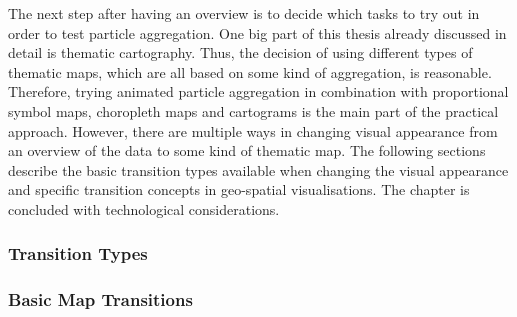 The next step after having an overview is to decide which tasks to try out in order to test particle aggregation. One big part of this thesis already discussed in detail is thematic cartography. Thus, the decision of using different types of thematic maps, which are all based on some kind of aggregation, is reasonable. Therefore, trying animated particle aggregation in combination with proportional symbol maps, choropleth maps and cartograms is the main part of the practical approach. However, there are multiple ways in changing visual appearance from an overview of the data to some kind of thematic map. The following sections describe the basic transition types available when changing the visual appearance and specific transition concepts in geo-spatial visualisations. The chapter is concluded with technological considerations.

\subsubsection{Transition Types}


\subsubsection{Basic Map Transitions}






